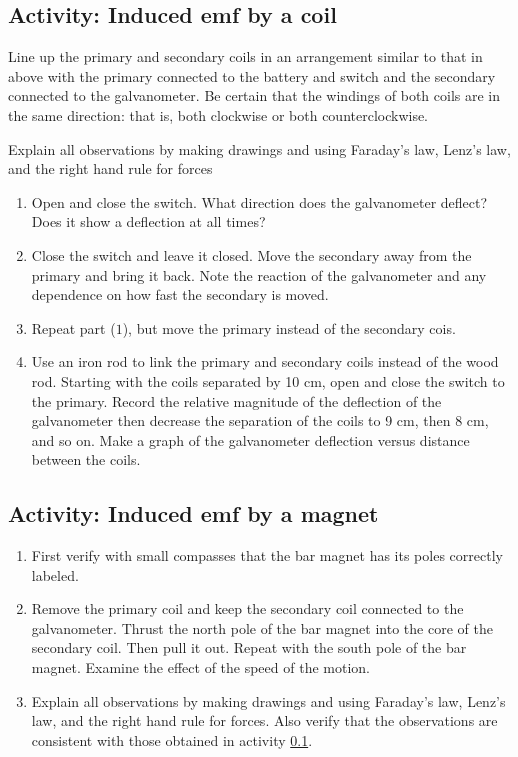 \begin{multicols}{2}
\subsection{Activity: Induced emf by a coil} \label{s:coilind}
	Line up the primary and secondary coils in an arrangement similar to that in  above with the primary connected to the battery and switch and the secondary connected to the galvanometer.  Be certain that the windings of both coils are in the same direction: that is, both clockwise or both counterclockwise. 
	
	Explain all observations by making drawings and using Faraday's law, Lenz's law, and the \textsf{right hand rule for forces}
\begin{enumerate}
	 \item Open and close the switch.  What direction does the galvanometer deflect?  Does it show a deflection at all times?  
	\item Close the switch and leave it closed.  Move the secondary away from the primary and bring it back.  Note the reaction of the galvanometer and any dependence on how fast the secondary is moved.
	\item Repeat part ($1$), but move the primary instead of the secondary cois.
	\item Use an iron rod to link the primary and secondary coils instead of the wood rod.  Starting with the coils separated by 10 cm, open and close the switch to the primary.  Record the relative magnitude of the deflection of the galvanometer then decrease the separation of the coils to 9 cm, then 8 cm, and so on.  Make a graph of the galvanometer deflection versus distance between the coils. 
\end{enumerate}

\subsection{Activity: Induced emf by a magnet}
\begin{enumerate}
	 \item First verify with small compasses that the bar magnet has its poles correctly labeled.
	\item  Remove the primary coil and keep the secondary coil connected to the galvanometer.  Thrust the north pole of the bar magnet into the core of the secondary coil.  Then pull it out.  Repeat with the south pole of the bar magnet.  Examine the effect of the speed of the motion.  
	\item Explain all observations by making drawings and using Faraday's law, Lenz's law, and the \textsf{right hand rule for forces}.  Also verify that the observations are consistent with those obtained in activity \ref{s:coilind}. 
\end{enumerate}


\end{multicols}
